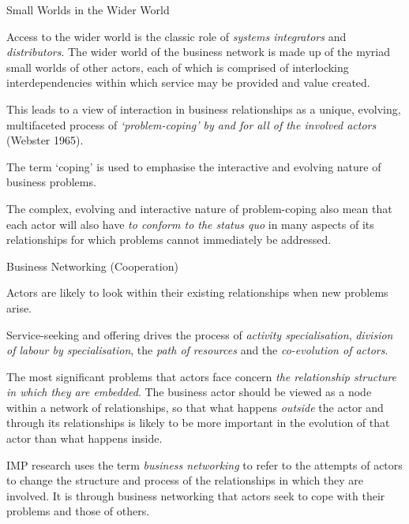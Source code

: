 \documentclass{beamer}
\begin{document}
\begin{frame}{Small Worlds in the Wider World}

Access to the wider world is the classic role of \emph{systems integrators}
and \emph{distributors}. The wider world of the business network is made up of
the myriad small worlds of other actors, each of which is comprised of
interlocking interdependencies within which service may be provided and value
created.

This leads to a view of interaction in business relationships as a unique,
evolving, multifaceted process of \emph{‘problem-coping’ by and for all of the
  involved actors} (Webster 1965).

The term ‘coping’ is used to emphasise the interactive and evolving nature of
business problems.

The complex, evolving and interactive nature of problem-coping also mean that
each actor will also have \emph{to conform to the status quo} in many aspects
of its relationships for which problems cannot immediately be addressed.

\end{frame}

\begin{frame}{Business Networking (Cooperation)}\small

Actors are likely to look within their existing relationships when new
problems arise.

Service-seeking and offering drives the process of \emph{activity
  specialisation}, \emph{division of labour by specialisation}, the \emph{path
  of resources} and the \emph{co-evolution of actors}.

The most signiﬁcant problems that actors face concern \emph{the relationship
  structure in which they are embedded}. The business actor should be viewed
as a node within a network of relationships, so that what happens
\emph{outside} the actor and through its relationships is likely to be more
important in the evolution of that actor than what happens inside.

IMP research uses the term \emph{business networking} to refer to the attempts
of actors to change the structure and process of the relationships in which
they are involved.  It is through business networking that actors seek to cope
with their problems and those of others.

\end{frame}
\end{document}
